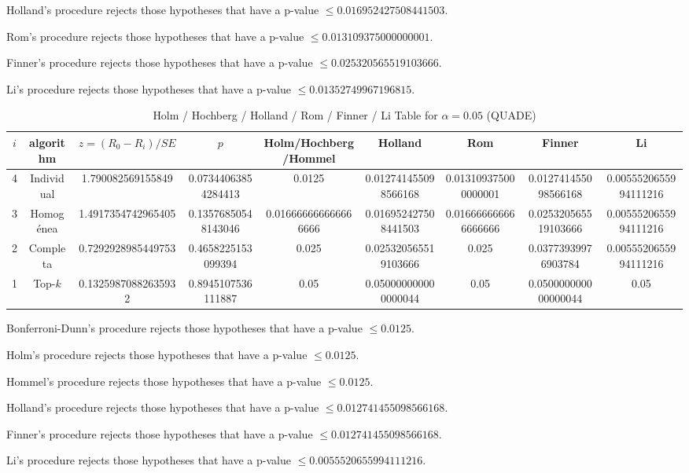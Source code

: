 \documentclass[a4paper,10pt]{article}
\begin{document}
\begin{landscape}
Holland's procedure rejects those hypotheses that have a p-value $\le0.016952427508441503$.


Rom's procedure rejects those hypotheses that have a p-value $\le0.013109375000000001$.


Finner's procedure rejects those hypotheses that have a p-value $\le0.025320565519103666$.


Li's procedure rejects those hypotheses that have a p-value $\le0.01352749967196815$.



\newpage

\begin{table}[!htp]
\centering\scriptsize
\caption{Holm / Hochberg / Holland / Rom / Finner / Li Table for $\alpha=0.05$ (QUADE)}
\begin{tabular}{ccccccccc}
$i$&algorithm&$z=(R_0 - R_i)/SE$&$p$&Holm/Hochberg/Hommel&Holland&Rom&Finner&Li\\
\hline
4&Individual&1.790082569155849&0.07344063854284413&0.0125&0.012741455098566168&0.013109375000000001&0.012741455098566168&0.0055520655994111216\\
3&Homogénea&1.4917354742965405&0.13576850548143046&0.016666666666666666&0.016952427508441503&0.016666666666666666&0.025320565519103666&0.0055520655994111216\\
2&Completa&0.7292928985449753&0.4658225153099394&0.025&0.025320565519103666&0.025&0.03773939976903784&0.0055520655994111216\\
1&Top-$k$&0.13259870882635932&0.8945107536111887&0.05&0.050000000000000044&0.05&0.050000000000000044&0.05\\
\hline
\end{tabular}
\end{table}
Bonferroni-Dunn's procedure rejects those hypotheses that have a p-value $\le0.0125$.


Holm's procedure rejects those hypotheses that have a p-value $\le0.0125$.


Hommel's procedure rejects those hypotheses that have a p-value $\le0.0125$.


Holland's procedure rejects those hypotheses that have a p-value $\le0.012741455098566168$.


Finner's procedure rejects those hypotheses that have a p-value $\le0.012741455098566168$.


Li's procedure rejects those hypotheses that have a p-value $\le0.0055520655994111216$.



\newpage


\end{landscape}
\end{document}
